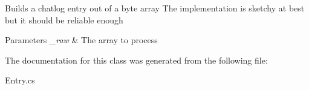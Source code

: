 Builds a chatlog entry out of a byte array The implementation is sketchy at best but it should be reliable enough 


\begin{DoxyParams}{Parameters}
{\em \-\_\-raw} & The array to process\\
\hline
\end{DoxyParams}


The documentation for this class was generated from the following file\-:\begin{DoxyCompactItemize}
\item 
Entry.\-cs\end{DoxyCompactItemize}
